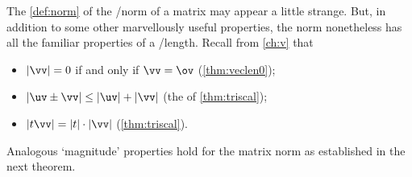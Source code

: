 The \cref{def:norm} of the \slash norm of a matrix may appear a little strange. 
But, in addition to some other marvellously useful properties, the norm nonetheless has all the familiar properties of a \slash length.
Recall from \cref{ch:v} that 
\begin{itemize}
\item \(|\vv|=0\) if and only if \(\vv=\ov\) (\cref{thm:veclen0});
\item \(|\uv\pm\vv|\leq|\uv|+|\vv|\) (the  of \cref{thm:triscal});
\item \(|t\vv|=|t|\cdot|\vv|\) (\cref{thm:triscal}).
\end{itemize}
Analogous `magnitude' properties hold for the matrix norm as established in the next theorem.




